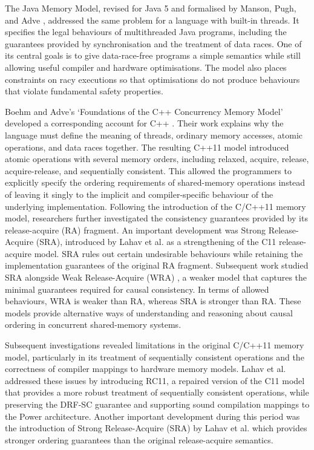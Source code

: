 The Java Memory Model, revised for Java 5 and formalised by Manson, Pugh, and Adve \cite{manson2005}, addressed the same problem for a language with built-in threads. It specifies the legal behaviours of multithreaded Java programs,  including the guarantees provided by synchronisation and the treatment of data races. One of its central goals is to give data-race-free programs a simple semantics while still allowing useful compiler and hardware optimisations. The model also places constraints on racy executions so that optimisations do not produce behaviours that violate fundamental safety properties.

Boehm and Adve's `Foundations of the C++ Concurrency Memory Model' developed a corresponding account for C++ \cite{boehm2008}. Their work explains why the language must define the meaning of threads, ordinary memory accesses, atomic operations, and data races together. The resulting C++11 \cite{Batty:2011}  model introduced atomic operations with several memory orders, including relaxed, acquire, release, acquire-release, and sequentially consistent. This allowed the programmers to explicitly specify the ordering requirements of shared-memory operations instead of leaving it  singly to the implicit and compiler-specific behaviour of the underlying implementation. Following the introduction of the C/C++11 memory model, researchers further investigated the consistency guarantees provided by its release-acquire (RA) fragment. An important development was Strong Release-Acquire (SRA), introduced by Lahav et al. \cite{Lahav:2016} as a strengthening of the C11 release-acquire model. SRA rules out certain undesirable behaviours while retaining the implementation guarantees of the original RA fragment. Subsequent work studied SRA alongside Weak Release-Acquire (WRA) \cite{Lahav:2022}, a weaker model that captures the minimal guarantees required for causal consistency. In terms of allowed behaviours, WRA is weaker than RA, whereas SRA is stronger than RA. These models provide alternative ways of understanding and reasoning about causal ordering in concurrent shared-memory systems.

Subsequent investigations revealed limitations in the original C/C++11 memory model, particularly in its treatment of sequentially consistent operations and the correctness of compiler mappings to hardware memory models. Lahav et al. \cite{Lahav2017} addressed these issues by introducing RC11, a repaired version of the C11 model that provides a more robust treatment of sequentially consistent operations, while preserving the DRF-SC guarantee and supporting sound compilation mappings to the Power architecture. Another important development during this period was the introduction of Strong Release-Acquire (SRA) by Lahav et al.  \cite{Lahav:2016} which provides stronger ordering guarantees than the original release-acquire semantics.

